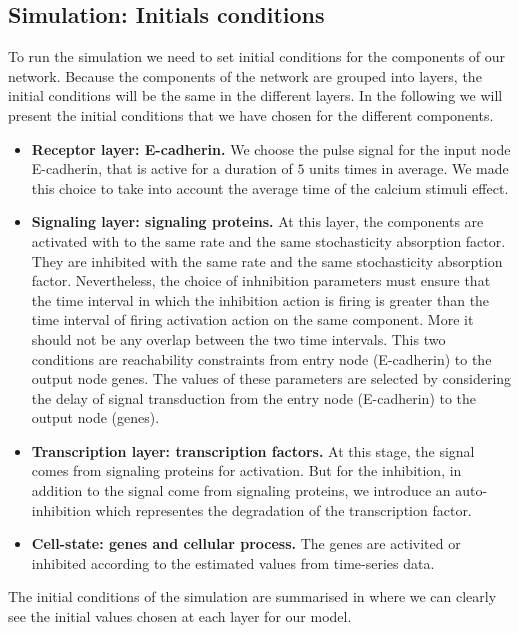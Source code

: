   


\subsection{Simulation: Initials conditions}
To run the simulation we need to set initial conditions for the components of our network. Because the components of the network are grouped into 
layers, the initial conditions will be the same in the different layers. In the following we will present the initial conditions that we have chosen for the different 
components.

\begin{itemize}
 \item \textbf{Receptor layer: E-cadherin.} We choose the  pulse signal for the input node E-cadherin, that is active for a duration of $5$ units times in average. We made this 
 choice to take into account the average time of the calcium stimuli effect.
 \item \textbf{Signaling layer: signaling proteins.} At this layer, the components are activated with to the same rate and the same stochasticity absorption factor. They are inhibited
 with the same rate and the same stochasticity absorption factor. Nevertheless, the choice of inhnibition parameters must ensure that the time interval in which the inhibition action 
 is firing is greater than the time interval of firing activation action on the same component. More it should not be any overlap between the two time intervals. This two conditions
 are reachability constraints from entry  node (E-cadherin) to the output node genes. The values of these parameters are selected by considering the delay of signal transduction from the entry
 node (E-cadherin) to the output node (genes).
 \item \textbf{Transcription layer: transcription factors.} At this stage, the signal comes from signaling proteins for activation. But for the inhibition, in addition 
 to the signal come from signaling proteins, we introduce an auto-inhibition which representes the degradation of the transcription factor.
 \item \textbf{Cell-state: genes and cellular  process.} The genes are activited or inhibited according to the estimated values from time-series data.
\end{itemize}

The initial conditions of the simulation are summarised in  where we can clearly see the initial values chosen at each layer for our model.


